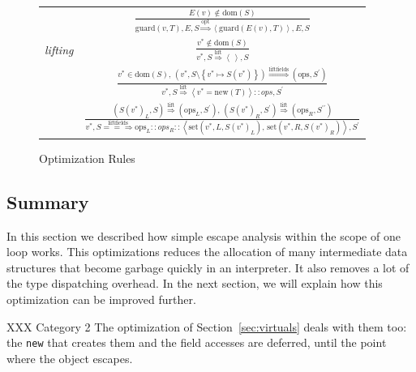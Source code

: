 \documentclass{sigplanconf}
\begin{document}
\begin{figure}
\begin{center}
{\begin{tabular}{lc}
 & ${\displaystyle \frac{E(v)\notin\mathrm{dom}(S)}{\mathrm{guard}(v,T),E,S\overset{\mathrm{opt}}{\Longrightarrow}\left\langle \mathrm{guard}(E\left(v\right),T)\right\rangle ,E,S}}$\tabularnewline[3em]
\emph{lifting} & ${\displaystyle \frac{v^{*}\notin\mathrm{dom}(S)}{v^{*},S\overset{\mathrm{lift}}{\Longrightarrow}\left\langle \,\right\rangle ,S}}$\tabularnewline[3em]
 & ${\displaystyle \frac{v^{*}\in\mathrm{dom}(S),\,\left(v^{*},S\setminus\left\{ v^{*}\mapsto S\left(v^{*}\right)\right\} \right)\overset{\mathrm{liftfields}}{\Longrightarrow}\left(\mathrm{ops},S^{\prime}\right)}{v^{*},S\overset{\mathrm{lift}}{\Longrightarrow}\left\langle v^{*}=\mathrm{new}\left(T\right)\right\rangle ::ops,S^{\prime}}}$\tabularnewline[3em]
 & ${\displaystyle \frac{\left(S\left(v^{*}\right)_{L},S\right)\overset{\mathrm{lift}}{\Longrightarrow}\left(\mathrm{ops}_{L},S^{\prime}\right),\,\left(S\left(v^{*}\right)_{R},S^{\prime}\right)\overset{\mathrm{lift}}{\Longrightarrow}\left(\mathrm{ops}_{R},S^{\prime\prime}\right)}{v^{*},S\overset{\mathrm{liftfields}}{=\!=\!\Longrightarrow}\mathrm{ops}_{L}::ops_{R}::\left\langle \mathrm{set}\left(v^{*},L,S\left(v^{*}\right)_{L}\right),\,\mathrm{set}\left(v^{*},R,S\left(v^{*}\right)_{R}\right)\right\rangle ,S^{\prime}}}$\tabularnewline
\end{tabular}
}
\end{center}
\label{fig:optimization}
\caption{Optimization Rules}
\end{figure}




\subsection{Summary}

In this section we described how simple escape analysis within the scope of one
loop works. This optimizations reduces the allocation of many intermediate data
structures that become garbage quickly in an interpreter. It also removes a lot
of the type dispatching overhead. In the next section, we will explain how this
optimization can be improved further.

XXX Category 2 The optimization of
Section~\ref{sec:virtuals} deals with them too: the \texttt{new} that creates them and
the field accesses are deferred, until the point where the object escapes.

\end{document}
